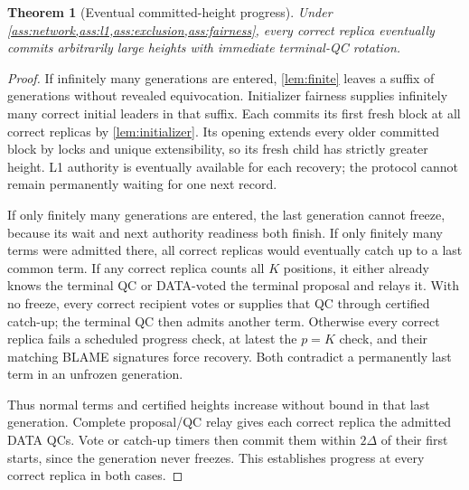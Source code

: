 \documentclass[11pt,a4paper]{article}
\newtheorem{theorem}[theorem]{Theorem}
\newcounter{protocol}
\begin{document}
\begin{theorem}[Eventual committed-height progress]
\label{thm:height}
Under \cref{ass:network,ass:l1,ass:exclusion,ass:fairness}, every correct
replica eventually commits arbitrarily large heights with immediate
terminal-QC rotation.
\end{theorem}
\begin{proof}
If infinitely many generations are entered, \cref{lem:finite} leaves
a suffix of generations without revealed equivocation. Initializer
fairness supplies infinitely many correct initial leaders in that suffix.
Each commits its first fresh block at all correct replicas by
\cref{lem:initializer}. Its opening extends every older committed block
by locks and unique extensibility, so its fresh child has strictly greater
height. L1 authority is eventually available for each recovery; the
protocol cannot remain permanently waiting for one next record.

If only finitely many generations are entered, the last generation
cannot freeze, because its wait and next authority readiness both finish.
If only finitely many terms were admitted there, all correct replicas
would eventually catch up to a last common term. If any correct replica
counts all $K$ positions, it either already knows the terminal QC or
DATA-voted the terminal proposal and relays it. With no freeze, every
correct recipient votes or supplies that QC through certified catch-up;
the terminal QC then admits another term. Otherwise every correct
replica fails a scheduled progress check, at latest the $p=K$ check,
and their matching BLAME signatures force recovery. Both contradict
a permanently last term in an unfrozen generation.

Thus normal terms and certified heights increase without bound in that
last generation. Complete proposal/QC relay gives each correct replica
the admitted DATA QCs. Vote or catch-up timers then commit them within
$2\Delta$ of their first starts, since the generation never freezes.
This establishes progress at every correct replica in both cases.
\end{proof}
\end{document}
